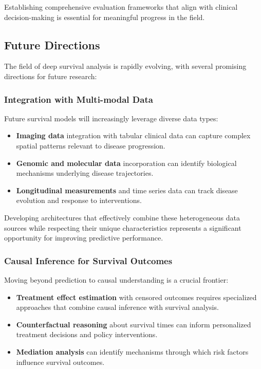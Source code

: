 Establishing comprehensive evaluation frameworks that align with clinical decision-making is essential for meaningful progress in the field.

\subsection{Future Directions}

The field of deep survival analysis is rapidly evolving, with several promising directions for future research:

\subsubsection{Integration with Multi-modal Data}

Future survival models will increasingly leverage diverse data types:

\begin{itemize}
    \item \textbf{Imaging data} integration with tabular clinical data can capture complex spatial patterns relevant to disease progression.

    \item \textbf{Genomic and molecular data} incorporation can identify biological mechanisms underlying disease trajectories.

    \item \textbf{Longitudinal measurements} and time series data can track disease evolution and response to interventions.
\end{itemize}

Developing architectures that effectively combine these heterogeneous data sources while respecting their unique characteristics represents a significant opportunity for improving predictive performance.

\subsubsection{Causal Inference for Survival Outcomes}

Moving beyond prediction to causal understanding is a crucial frontier:

\begin{itemize}
    \item \textbf{Treatment effect estimation} with censored outcomes requires specialized approaches that combine causal inference with survival analysis.

    \item \textbf{Counterfactual reasoning} about survival times can inform personalized treatment decisions and policy interventions.

    \item \textbf{Mediation analysis} can identify mechanisms through which risk factors influence survival outcomes.
\end{itemize}

